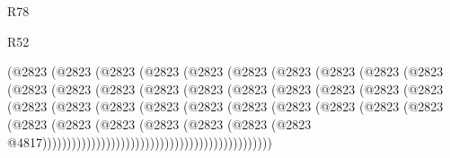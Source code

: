 \begin{lexlean}{R78}
\begin{lexlean}{R52}
\begin{coremodule}
{{{{{{{{{{{{{{{{{{{{{{{{{{{{{{{{{{{{{{{{{{{{{{{{{{{{{{{{{{{{{{{{{{{{{{{{{{{{{{{{{{{{{{{{{{{{{{{{{{{{{{{{{{{{{{{{{{{{{{{{{{{{{{{{{{{{{{{{{{{{{{{{{{{{{{{{{{{{{{{{{{{{{{{{{{{{{{{{{{{{{{{{{{{{{{{{{{{{{{                        (@2823
                          (@2823
                            (@2823
                              (@2823
                                (@2823
                                  (@2823
                                    (@2823
                                      (@2823
                                        (@2823
                                          (@2823
                                            (@2823
                                              (@2823
                                                (@2823
                                                  (@2823
                                                    (@2823
                                                      (@2823
                                                        (@2823
                                                          (@2823
                                                            (@2823
                                                              (@2823
                                                                (@2823
                                                                  (@2823
                                                                    (@2823
                                                                      (@2823
                                                                        (@2823
                                                                          (@2823
                                                                            (@2823
                                                                              (@2823
                                                                                (@2823
                                                                                  (@2823
                                                                                    (@2823
                                                                                      (@2823
                                                                                        (@2823
                                                                                          (@2823
                                                                                            (@2823
                                                                                              (@2823
                                                                                                (@2823
                                                                                                  @4817)))))))))))))))))))))))))))))))))))))))))))))))
}}}}}}}}}}}}}}}}}}}}}}}}}}}}}}}}}}}}}}}}}}}}}}}}}}}}}}}}}}}}}}}}}}}}}}}}}}}}}}}}}}}}}}}}}}}}}}}}}}}}}}}}}}}}}}}}}}}}}}}}}}}}}}}}}}}}}}}}}}}}}}}}}}}}}}}}}}}}}}}}}}}}}}}}}}}}}}}}}}}}}}}}}}}}}}}}}}}}}}
\end{coremodule}
\end{lexlean}
\end{lexlean}
